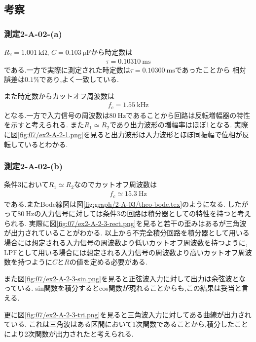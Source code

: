 \subsection{考察}
\subsubsection{測定2-A-02-(a)}
$R_2=1.001\ \si{\kilo\ohm}$, $C=0.103\ \si{\micro\farad}$から時定数は
\begin{align}
  \tau=0.10310\ \si{\milli\second}
\end{align}
である.一方で実際に測定された時定数は$\tau=0.10300\ \si{\milli\second}$であったことから
相対誤差は$0.1\%$であり,よく一致している.

また時定数からカットオフ周波数は
\begin{align}
  f_c=1.55\ \si{\kilo\hertz}
\end{align}
となる.一方で入力信号の周波数は$80\ \si{\hertz}$であることから回路は反転増幅器の特性を示すと考えられる.
また$R_1\simeq R_2$であり出力波形の増幅率はほぼ1となる.
実際に図\ref{fig:07/ex2-A-2-1.png}を見ると出力波形は入力波形とほぼ同振幅で位相が反転しているとわかる.
\subsubsection{測定2-A-02-(b)}
条件3において$R_1\simeq R_2$なのでカットオフ周波数は
\begin{align}
  f_c\simeq15.3\ \si{\hertz}
\end{align}
である.またBode線図は図\ref{fig:graph/2-A-03/theo-bode.tex}のようになる.
したがって$80\ \si{\hertz}$の入力信号に対しては条件3の回路は積分器としての特性を持つと考えられる.
実際に図\ref{fig:07/ex2-A-2-3-rect.png}を見ると若干の歪みはあるが三角波が出力されていることがわかる.
以上から不完全積分回路を積分器として用いる場合には想定される入力信号の周波数より低いカットオフ周波数を持つように,
LPFとして用いる場合には想定される入力信号の周波数より高いカットオフ周波数を持つように$C$と$R$の値を定める必要がある.

また図\ref{fig:07/ex2-A-2-3-sin.png}を見ると正弦波入力に対して出力は余弦波となっている.
sin関数を積分するとcos関数が現れることからも,この結果は妥当と言える.

更に図\ref{fig:07/ex2-A-2-3-tri.png}を見ると三角波入力に対してある曲線が出力されている.
これは三角波はある区間において1次関数であることから,積分したことにより2次関数が出力されたと考えられる.
